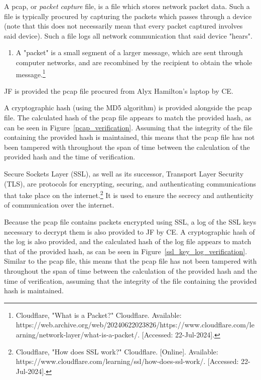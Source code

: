 \begin{myenum}
	\item A pcap, or \emph{packet capture} file, is a file which stores network packet data. Such a file is typically procured by capturing the packets which passes through a device (note that this does not necessarily mean that every packet captured involves said device). Such a file logs all network communication that said device "hears".
		\begin{enumerate}
			\item A "packet" is a small segment of a larger message, which are sent through computer networks, and are recombined by the recipient to obtain the whole message.\footnote{Cloudflare, "What is a Packet?" Cloudflare. Available: https://web.archive.org/web/20240622023826/https://www.cloudflare.com/learning/network-layer/what-is-a-packet/. [Accessed: 22-Jul-2024].}
		\end{enumerate}
	\item JF is provided the pcap file procured from Alyx Hamilton's laptop by CE. 
	\item A cryptographic hash (using the MD5 algorithm) is provided alongside the pcap file. The calculated hash of the pcap file appears to match the provided hash, as can be seen in Figure~\ref{pcap_verification}. Assuming that the integrity of the file containing the provided hash is maintained, this means that the pcap file has not been tampered with throughout the span of time between the calculation of the provided hash and the time of verification.
	\item Secure Sockets Layer (SSL), as well as its successor, Transport Layer Security (TLS), are protocols for encrypting, securing, and authenticating communications that take place on the internet.\footnote{Cloudflare, "How does SSL work?" Cloudflare. [Online]. Available: https://www.cloudflare.com/learning/ssl/how-does-ssl-work/. [Accessed: 22-Jul-2024].} It is used to ensure the secrecy and authenticity of communication over the internet.
	\item Because the pcap file contains packets encrypted using SSL, a log of the SSL keys necessary to decrypt them is also provided to JF by CE. A cryptographic hash of the log is also provided, and the calculated hash of the log file appears to match that of the provided hash, as can be seen in Figure~\ref{ssl_key_log_verification}. Similar to the pcap file, this means that the pcap file has not been tampered with throughout the span of time between the calculation of the provided hash and the time of verification, assuming that the integrity of the file containing the provided hash is maintained.

\end{myenum}
